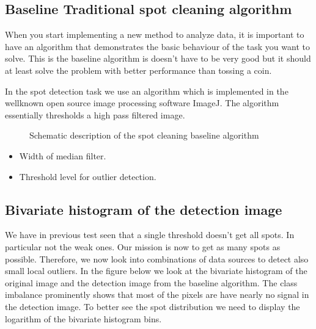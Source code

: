 \documentclass[letterpaper,10pt,english]{sphinxmanual}
\begin{document}
\subsection{Baseline \sphinxhyphen{} Traditional spot cleaning algorithm}
\label{\detokenize{ML4NeutronImageSegmentation:baseline-traditional-spot-cleaning-algorithm}}
When you start implementing a new method to analyze data, it is important to have an algorithm that demonstrates the basic behaviour of the task you want to solve. This is the baseline algorithm is doesn’t have to be very good but it should at least solve the problem with better performance than tossing a coin.

In the spot detection task we use an algorithm which is implemented in the well\sphinxhyphen{}known open source image processing software ImageJ. The algorithm essentially thresholds a high pass filtered image.

\begin{figure}[htbp]
\centering
\capstart

\noindent{}
\caption{Schematic description of the spot cleaning baseline algorithm}\label{\detokenize{ML4NeutronImageSegmentation:id19}}\end{figure}



\begin{itemize}
\item {} 
 Width of median filter.

\item {} 
 Threshold level for outlier detection.

\end{itemize}


\subsection{Bivariate histogram of the detection image}
\label{\detokenize{ML4NeutronImageSegmentation:bivariate-histogram-of-the-detection-image}}
We have in previous test seen that a single threshold doesn’t get all spots. In particular not the weak ones. Our mission is now to get as many spots as possible. Therefore, we now look into combinations of data sources to detect also small local outliers. In the figure below we look at the bivariate histogram of the original image and the detection image from the baseline algorithm. The class imbalance prominently shows that most of the pixels are have nearly no signal in the detection image. To better see the spot distribution we need to display the logarithm of the bivariate histogram bins.
\end{document}
